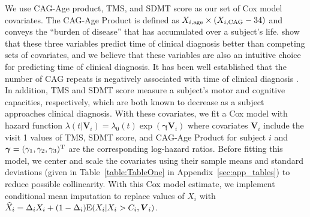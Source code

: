 \documentclass[12pt]{article}
\def\bse{\begin{eqnarray*}}
\def\ese{\end{eqnarray*}}
\def\bse{\begin{eqnarray*}}
\def\ese{\end{eqnarray*}}
\def\trans{^{\rm T}}
\newcommand{\bgamma}{\mbox{\boldmath $\gamma$}}
\def\bgamma{{\boldsymbol{\gamma}}}
\def\bV{{\boldsymbol V}}
\begin{document}
We use CAG-Age product, TMS, and SDMT score as our set of Cox model covariates. The CAG-Age Product is defined as $X_{i, \rm age} \times (X_{i, \rm CAG} - 34)$ \citep{zhang2011indexing} and conveys the ``burden of disease'' that has accumulated over a subject's life. \cite{long2017validation} show that these three variables predict time of clinical diagnosis better than competing sets of covariates, and we believe that these variables are also an intuitive choice for predicting time of clinical diagnosis. It has been well established that the number of CAG repeats is negatively associated with time of clinical diagnosis \citep{long2017validation}. In addition, TMS and SDMT score measure a subject's motor and cognitive capacities, respectively, which are both known to decrease as a subject approaches clinical diagnosis. With these covariates, we fit a Cox model with hazard function
$\lambda(t|\bV_i)=\lambda_0(t)\exp(\bgamma\bV_i)$
where covariates $\bV_i$ include the visit 1 values of TMS, SDMT score, and CAG-Age Product for subject $i$ and $\bgamma = (\gamma_1,\gamma_2,\gamma_3)\trans$ are the corresponding log-hazard ratios. Before fitting this model, we center and scale the covariates using their sample means and standard deviations (given in Table~\ref{table:TableOne} in Appendix~\ref{sec:app_tables}) to reduce possible collinearity.
With this Cox model estimate, we implement conditional mean imputation to replace values of $X_i$ with $\widehat{X}_i=\Delta_iX_i+(1-\Delta_i){\rm E}(X_i|X_i>C_i,\bV_i)$. 

\end{document}
